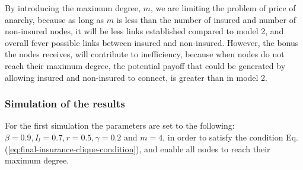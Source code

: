 By introducing the maximum degree, $m$, we are limiting the problem of price of anarchy, because as long as $m$ is less than the number of insured and number of non-insured nodes, it will be less links established compared to model 2, and overall fever possible links between insured and non-insured. However, the bonus the nodes receives, will contribute to inefficiency, because when nodes do not reach their maximum degree, the potential payoff that could be generated by allowing insured and non-insured to connect, is greater than in model 2.


\subsubsection{Simulation of the results}
For the first simulation the parameters are set to the following: $\beta=0.9, I_{l}=0.7, r=0.5, \gamma=0.2 \text{ and }m=4$, in order to satisfy the condition Eq.(\ref{eq:final-insurance-clique-condition}), and enable all nodes to reach their maximum degree.  

